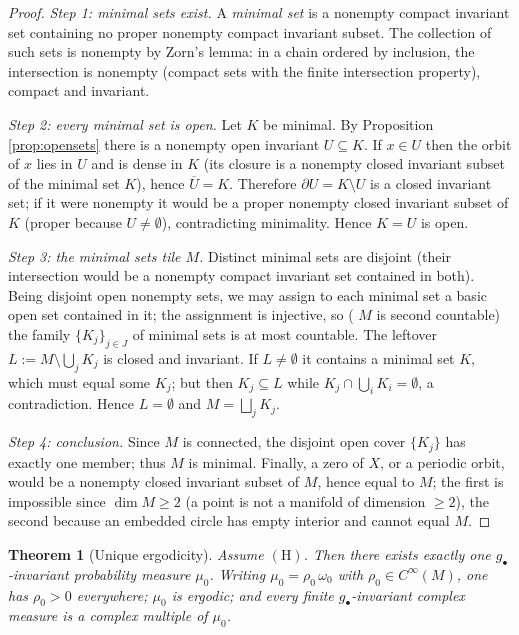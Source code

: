 \documentclass[11pt]{amsart}
\theoremstyle{plain}
\newtheorem{theorem}{Theorem}[section]
\theoremstyle{definition}
\theoremstyle{remark}
\begin{document}
\begin{proof}
\emph{Step 1: minimal sets exist.} A \emph{minimal set} is a nonempty
compact invariant set containing no proper nonempty compact invariant
subset. The collection of such sets is nonempty by Zorn's lemma: in a
chain ordered by inclusion, the intersection is nonempty (compact sets
with the finite intersection property), compact and invariant.

\emph{Step 2: every minimal set is open.} Let $K$ be minimal. By
Proposition \ref{prop:opensets} there is a nonempty open invariant
$U\subseteq K$. If $x\in U$ then the orbit of $x$ lies in $U$ and is
dense in $K$ (its closure is a nonempty closed invariant subset of the
minimal set $K$), hence $\overline U=K$. Therefore
$\partial U=K\setminus U$ is a closed invariant set; if it were nonempty
it would be a proper nonempty closed invariant subset of $K$ (proper
because $U\neq\emptyset$), contradicting minimality. Hence $K=U$ is
open.

\emph{Step 3: the minimal sets tile $M$.} Distinct minimal sets are
disjoint (their intersection would be a nonempty compact invariant set
contained in both). Being disjoint open nonempty sets, we may assign to
each minimal set a basic open set contained in it; the assignment is
injective, so ( $M$ is second countable) the family
$\{K_j\}_{j\in J}$ of minimal sets is at most countable. The leftover
$L:=M\setminus\bigcup_jK_j$ is closed and invariant. If $L\neq\emptyset$
it contains a minimal set $K$, which must equal some $K_j$; but then
$K_j\subseteq L$ while $K_j\cap\bigcup_iK_i=\emptyset$, a contradiction.
Hence $L=\emptyset$ and $M=\bigsqcup_j K_j$.

\emph{Step 4: conclusion.} Since $M$ is connected, the disjoint open
cover $\{K_j\}$ has exactly one member; thus $M$ is minimal. Finally, a
zero of $X$, or a periodic orbit, would be a nonempty closed invariant
subset of $M$, hence equal to $M$; the first is impossible since
$\dim M\ge2$ (a point is not a manifold of dimension $\ge2$), the second
because an embedded circle has empty interior and cannot equal $M$.
\end{proof}

\begin{theorem}[Unique ergodicity]\label{thm:unique}
Assume $(\mathrm{H})$. Then there exists exactly one
$g_\bullet$-invariant probability measure $\mu_0$. Writing
$\mu_0=\rho_0\,\omega_0$ with $\rho_0\in C^\infty(M)$, one has
$\rho_0>0$ everywhere; $\mu_0$ is ergodic; and every finite
$g_\bullet$-invariant complex measure is a complex multiple of $\mu_0$.
\end{theorem}
\end{document}
